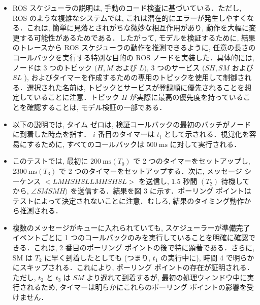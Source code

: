 \begin{frame}{}
    \begin{itemize}
        \item ROS スケジューラの説明は, 手動のコード検査に基づいている．ただし, ROS のような複雑なシステムでは, これは潜在的にエラーが発生しやすくなる．これは, 簡単に見落とされがちな微妙な相互作用があり, 動作を大幅に変更する可能性があるためである．したがって, モデルを検証するために, 結果のトレースから ROS スケジューラの動作を推測できるように, 任意の長さのコールバックを実行する特別な目的の ROS ノードを実装した．具体的には, ノードは 3 つのトピック $(H, M$ および $L)$, 3 つのサービス $(S H, S M$ および $S L$ ), およびタイマーを作成するための専用のトピックを使用して制御される．選択された名前は, トピックとサービスが登録順に優先されることを想定していることに注意．トピック $H$ が実際に最高の優先度を持っていることを確認することは, モデル検証の一部である．
    \end{itemize}
\end{frame}

\begin{frame}{}
    \begin{itemize}
        \item 以下の説明では, タイム ゼロは, 検証コールバックの最初のバッチがノードに到着した時点を指す． $i$ 番目のタイマーは $t_{i}$ として示される．視覚化を容易にするために, すべてのコールバックは $500 \mathrm{~ms}$ に対して実行される．
    \end{itemize}
\end{frame}

\begin{frame}{}
    \begin{itemize}
        \item このテストでは, 最初に $200 \mathrm{~ms}\left(T_{0}\right)$ で 2 つのタイマーをセットアップし, $2300 \mathrm{~ms}\left(T_{3}\right)$ で 2 つのタイマーをセットアップする．次に, メッセージ シーケンス $<L M H S H S L L M H S H S L>$ を送信し, $1.5$ 秒間 $\left(T_{2}\right)$ 待機してから, $\angle S M S M H\rangle$ を送信する．結果を図 3 に示す．ポーリング ポイントはテストによって決定されないことに注意．むしろ, 結果のタイミング動作から推測される．
    \end{itemize}
\end{frame}

\begin{frame}{}
    \begin{itemize}
        \item 複数のメッセージがキューに入れられていても, スケジューラーが準備完了イベントごとに 1 つのコールバックのみを実行していることを明確に確認できる．これは, 2 番目のポーリング ポイントの後で特に顕著である．さらに, SM は $T_{2}$ に早く到着したとしても (つまり,  $t_{1}$ の実行中に), 時間 4 で明らかにスキップされる．これにより, ポーリング ポイントの存在が証明される．ただし, $t_{2}$ と $t_{3}$ は $S M$ より遅れて到着するが, 最初の処理ウィンドウ中に実行されるため, タイマーは明らかにこれらのポーリング ポイントの影響を受けません．
    \end{itemize}
\end{frame}
